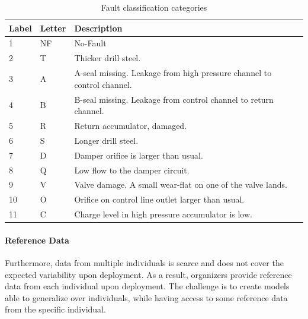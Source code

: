 \begin{table}[!htb]
    \small
    \caption{Fault classification categories}
    \label{tab:faults}
    \vspace{-1em}
    \begin{center}    
    \begin{tabular}{lll}   
        \toprule 
        Label & Letter & Description \\
        \midrule
        1 & NF & No-Fault \\
        2 & T & Thicker drill steel. \\
        3 & A & A-seal missing. Leakage from high pressure channel to control channel. \\
        4 & B & B-seal missing. Leakage from control channel to return channel. \\
        5 & R & Return accumulator, damaged. \\
        6 & S & Longer drill steel. \\
        7 & D & Damper orifice is larger than usual. \\
        8 & Q & Low flow to the damper circuit. \\
        9 & V & Valve damage. A small wear-flat on one of the valve lands. \\
        10 & O & Orifice on control line outlet larger than usual. \\
        11 & C & Charge level in high pressure accumulator is low. \\
        \bottomrule
    \end{tabular}
    \end{center}
\end{table}

\paragraph{Reference Data}
Furthermore, data from multiple individuals is scarce and does not cover the expected variability upon deployment. 
As a result, organizers provide reference data from each individual upon deployment. %
The challenge is to create models able to generalize over individuals, while having access to some reference data from the specific individual. 


